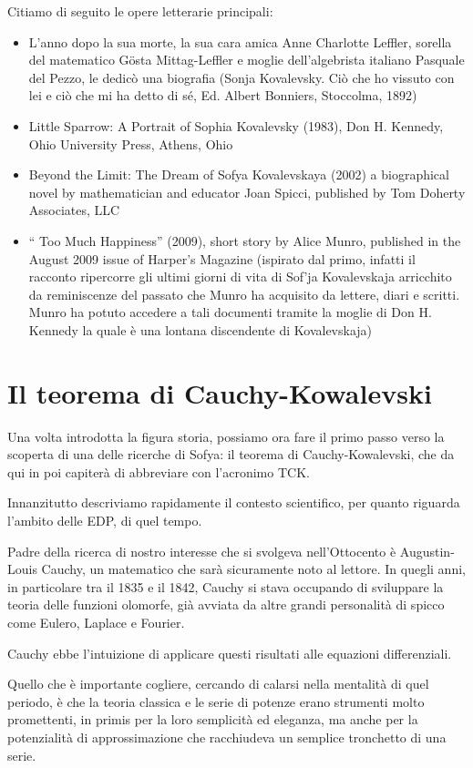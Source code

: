 Citiamo di seguito le opere letterarie principali:
\begin{itemize}
\item L'anno dopo la sua morte, la sua cara amica Anne Charlotte Leffler,
sorella del matematico Gösta Mittag-Leffler e moglie dell'algebrista
italiano Pasquale del Pezzo, le dedicò una biografia (Sonja Kovalevsky.
Ciò che ho vissuto con lei e ciò che mi ha detto di sé, Ed. Albert
Bonniers, Stoccolma, 1892)
\item Little Sparrow: A Portrait of Sophia Kovalevsky (1983), Don H. Kennedy,
Ohio University Press, Athens, Ohio 
\item Beyond the Limit: The Dream of Sofya Kovalevskaya (2002) a biographical
novel by mathematician and educator Joan Spicci, published by Tom
Doherty Associates, LLC
\item `` Too Much Happiness'' (2009), short story
by Alice Munro, published in the August 2009 issue of Harper's Magazine
(ispirato dal primo, infatti il racconto ripercorre gli ultimi giorni
di vita di Sof'ja Kovalevskaja arricchito da reminiscenze del passato
che Munro ha acquisito da lettere, diari e scritti. Munro ha potuto
accedere a tali documenti tramite la moglie di Don H. Kennedy la quale
è una lontana discendente di Kovalevskaja)
\end{itemize}

\section{Il teorema di Cauchy-Kowalevski}

Una volta introdotta la figura storia, possiamo ora fare il primo passo verso la scoperta di una delle ricerche di Sofya: il teorema di Cauchy-Kowalevski, che da qui in poi capiterà di abbreviare con l'acronimo TCK.

Innanzitutto descriviamo rapidamente il contesto scientifico, per quanto riguarda l'ambito delle EDP, di quel tempo. 

Padre della ricerca di nostro interesse che si svolgeva nell'Ottocento è Augustin-Louis Cauchy, un matematico che sarà sicuramente noto al lettore. In quegli anni, in particolare tra il 1835 e il 1842, Cauchy si stava occupando di sviluppare la teoria delle funzioni olomorfe, già avviata da altre grandi personalità di spicco come Eulero, Laplace e Fourier.

Cauchy ebbe l'intuizione di applicare questi risultati alle equazioni differenziali. 

Quello che è importante cogliere, cercando di calarsi nella mentalità di quel periodo, è che la teoria classica e le serie di potenze erano strumenti molto promettenti, in primis per la loro semplicità ed eleganza, ma anche per la potenzialità di approssimazione che racchiudeva un semplice tronchetto di una serie.

